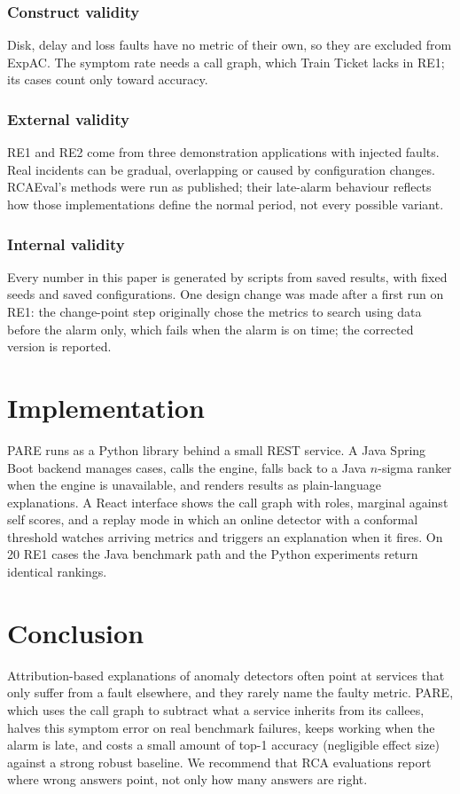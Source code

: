 \documentclass[conference]{IEEEtran}
\begin{document}
\subsubsection{Construct validity}
Disk, delay and loss faults have no metric of their own, so they are excluded from
ExpAC. The symptom rate needs a call graph, which Train Ticket lacks in RE1; its
cases count only toward accuracy.

\subsubsection{External validity}
RE1 and RE2 come from three demonstration applications with injected faults. Real
incidents can be gradual, overlapping or caused by configuration changes. RCAEval's
methods were run as published; their late-alarm behaviour reflects how those
implementations define the normal period, not every possible variant.

\subsubsection{Internal validity}
Every number in this paper is generated by scripts from saved results, with fixed
seeds and saved configurations. One design change was made after a first run on
RE1: the change-point step originally chose the metrics to search using data before
the alarm only, which fails when the alarm is on time; the corrected version is
reported.

\section{Implementation}
PARE runs as a Python library behind a small REST service. A Java Spring Boot
backend manages cases, calls the engine, falls back to a Java $n$-sigma ranker when
the engine is unavailable, and renders results as plain-language explanations. A
React interface shows the call graph with roles, marginal against self scores, and
a replay mode in which an online detector with a conformal threshold watches
arriving metrics and triggers an explanation when it fires. On 20 RE1 cases the
Java benchmark path and the Python experiments return identical rankings.

\section{Conclusion}
Attribution-based explanations of anomaly detectors often point at services that
only suffer from a fault elsewhere, and they rarely name the faulty metric. PARE,
which uses the call graph to subtract what a service inherits from its callees,
halves this symptom error on real benchmark failures, keeps working when the alarm
is late, and costs a small amount of top-1 accuracy (negligible effect size)
against a strong robust baseline. We recommend that RCA evaluations report where wrong answers
point, not only how many answers are right.



\end{document}
